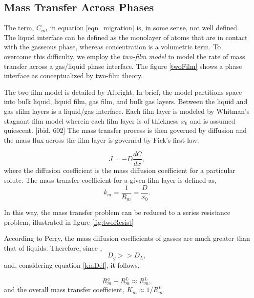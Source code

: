 \subsection{Mass Transfer Across Phases}
\label{sec:MT_Phases}
The term, $C_{int}$ in equation \ref{eqn_migration} is, in some sense, not well defined.  The liquid interface can be defined as the monolayer of atoms that are in contact with the gasseous phase, whereas concentration is a volumetric term.  To overcome this difficulty,  we employ the \textit{two-film model} to model the rate of mass transfer across a gas/liquid phase interface.  The figure \ref{twoFilm} shows a phase interface as conceptualized by two-film theory.



The two film model is detailed by Albright. \cite[p. 604]{Albright2008}  In brief, the model partitions space into bulk liquid, liquid film, gas film, and  bulk gas layers.  Between the liquid and gas sfilm layers is a liquid/gas interface.  Each film layer is modeled by Whitman's stagnant film model wherein each film layer is of thickness $x_0$ and is assumed quiescent. [ibid. 602]  The mass transfer process is then governed by diffusion and the mass flux across the film layer is governed by Fick's first law,

\begin{equation}
    J = - D \frac{dC}{dx}, 
\end{equation}
where the diffusion coefficient is the mass diffusion coefficient for a particular solute.  The mass transfer coefficient for a given film layer is defined as,
\begin{equation}
    \label{kmDef}
    k_m = \frac{1}{R_m} = \frac{D}{x_0}.
\end{equation}

In this way, the mass transfer problem can be reduced to a series resistance problem, illustrated in figure \ref{fig:twoResist}


According to Perry, the mass diffusion coefficients of gasses are much greater than that of liquids. \cite[sec. 5 p. 48]{Perry2008} Therefore, since ,
\begin{equation}
    D_g >> D_L,
\end{equation}
and, considering equation \ref{kmDef}, it follows,

\begin{equation}
    R_m^g+R_m^L \approx R_m^L,
\end{equation}
and the overall mass transfer coefficient, $K_m \approx 1 / R_m^L$.

